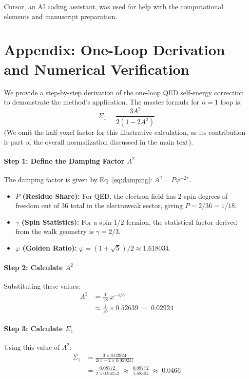 \documentclass[11pt,a4paper]{article}
\theoremstyle{definition}
\theoremstyle{remark}
\begin{document}
Cursor, an AI coding assistant, was used for help with the computational elements and manuscript preparation.

\appendix

\section{Appendix: One-Loop Derivation and Numerical Verification}
\label{app:oneloop}

We provide a step-by-step derivation of the one-loop QED self-energy correction to demonstrate the method's application. The master formula for $n=1$ loop is:
\[
\Sigma_1 = \frac{3A^2}{2(1-2A^2)}
\]
(We omit the half-voxel factor for this illustrative calculation, as its contribution is part of the overall normalization discussed in the main text).

\paragraph{Step 1: Define the Damping Factor $A^2$}
The damping factor is given by Eq. \eqref{eq:damping}: $A^2 = P\varphi^{-2\gamma}$.
\begin{itemize}
    \item \textbf{$P$ (Residue Share):} For QED, the electron field has 2 spin degrees of freedom out of 36 total in the electroweak sector, giving $P = 2/36 = 1/18$.
    \item \textbf{$\gamma$ (Spin Statistics):} For a spin-1/2 fermion, the statistical factor derived from the walk geometry is $\gamma = 2/3$.
    \item \textbf{$\varphi$ (Golden Ratio):} $\varphi = (1+\sqrt{5})/2 \approx 1.618034$.
\end{itemize}

\paragraph{Step 2: Calculate $A^2$}
Substituting these values:
\begin{align*}
A^2 &= \frac{1}{18} \, \varphi^{-4/3} \\
    &\approx \frac{1}{18} \times 0.52639 \;=\; 0.02924
\end{align*}

\paragraph{Step 3: Calculate $\Sigma_1$}
Using this value of $A^2$:
\begin{align*}
\Sigma_1 &= \frac{3 \times 0.02924}{2\bigl(1 - 2 \times 0.02924\bigr)} \\
    &= \frac{0.08772}{2\times 0.94152} \;\approx\; \frac{0.08772}{1.88304} \;\approx\; 0.0466
\end{align*}
\end{document}
